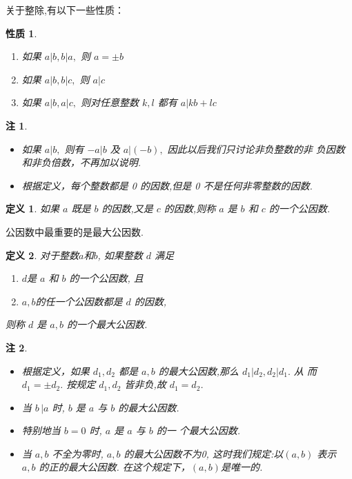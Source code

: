 \documentclass[11pt,punct]{ctexbeamer}
\newtheorem*{defi}{定义}
\newtheorem*{rem}{注}
\newtheorem*{prop}{性质}
\begin{document}
\begin{frame}
关于整除,有以下一些性质：
\begin{prop}
\begin{enumerate}
\item 如果 $a|b, b| a,$ 则 $a=\pm b$
\item 如果 $a|b, b| c,$ 则 $a | c$
\item  如果 $a|b, a| c,$ 则对任意整数 $k, l$ 都有 $a | k b+l c$
\end{enumerate}
\end{prop}
\begin{rem}
\begin{itemize}
\item 如果 $a | b,$ 则有 $-a | b$ 及 $a |(-b),$ 因此以后我们只讨论\alert{非负整数}的\alert{非 负因数}和\alert{非负倍数}，不再加以说明.

\item 根据定义，每个整数都是 0 的因数,但是 0 不是任何非零整数的因数.
\end{itemize}
\end{rem}


\begin{defi}
    如果 $a$ 既是 $b$ 的因数,又是 $c$ 的因数,则称 $a$ 是 $b$ 和 $c$ 的一个\alert{公因数}.
\end{defi}

\end{frame}




\begin{frame}
公因数中最重要的是最大公因数.

\begin{defi}
    对于整数$a$和$b$, 如果整数 $d$ 满足
    \begin{enumerate}
        \item $d$是 $a$ 和 $b$ 的一个公因数, 且
        \item $a, b $的任一个公因数都是 $d$ 的因数,
    \end{enumerate}
    则称 $d$ 是 $a, b$ 的一个\alert{最大公因数}.
\end{defi}

\begin{rem}
	\begin{itemize}
\item 根据定义，如果 $d_{1}, d_{2}$ 都是 $a, b$ 的最大公因数,那么 $d_{1}\left|d_{2}, d_{2}\right| d_{1} .$ 从
而 $d_{1}=\pm d_{2} .$
按规定 $d_{1}, d_{2}$ 皆非负,故 $d_{1}=d_{2}$.

\item 当 $b\,  | a$ 时, $b$ 是 $a$ 与 $b$ 的最大公因数.

\item 特别地当 $b=0$ 时, $a$ 是 $a$ 与 $b$ 的一 个最大公因数.

\item 当 $a, b$  不全为零时, $a,b$ 的最大公因数不为0,  这时我们规定:以$(a, b)$ 表示 $a, b$ 的正的最大公因数. 在这个规定下，$(a, b)$是唯一的.
\end{itemize}
\end{rem}
\end{frame}
\end{document}
